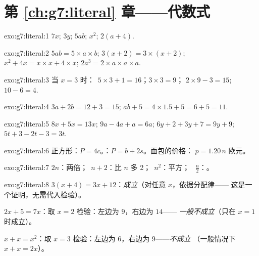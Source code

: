 \section*{第 \ref{ch:g7:literal} 章——代数式}

\begin{solution}{exo:g7:literal:1}
$7x$; \quad $3y$; \quad $5ab$; \quad $x^2$; \quad $2(a + 4)$.
\end{solution}

\begin{solution}{exo:g7:literal:2}
$5ab = 5 \times a \times b$; \quad
$3(x+2) = 3 \times (x + 2)$; \quad
$x^2 + 4x = x \times x + 4 \times x$; \quad
$2a^3 = 2 \times a \times a \times a$.
\end{solution}

\begin{solution}{exo:g7:literal:3}
当 $x = 3$ 时：\ $5 \times 3 + 1 = 16$；\quad $3 \times 3 = 9$；\quad
$2 \times 9 - 3 = 15$; \quad $10 - 6 = 4$.
\end{solution}

\begin{solution}{exo:g7:literal:4}
$3a + 2b = 12 + 3 = 15$; \qquad
$ab + 5 = 4 \times 1.5 + 5 = 6 + 5 = 11$.
\end{solution}

\begin{solution}{exo:g7:literal:5}
$8x + 5x = 13x$; \quad
$9a - 4a + a = 6a$; \quad
$6y + 2 + 3y + 7 = 9y + 9$; \quad
$5t + 3 - 2t - 3 = 3t$.
\end{solution}

\begin{solution}{exo:g7:literal:6}
正方形：$P = 4c$。：$P = b + 2s$。面包的价格：
$p = 1.20\,n$ 欧元。
\end{solution}

\begin{solution}{exo:g7:literal:7}
$2n$：两倍；\ $n + 2$：比 $n$ 多 2；\ $n^2$：平方；
\ $\frac n2$：。
\end{solution}

\begin{solution}{exo:g7:literal:8}
$3(x+4) = 3x + 12$：\emph{成立}（对任意 $x$，依据分配律——
这是一个证明，无需代入检验）。

$2x + 5 = 7x$：取 $x = 2$ 检验：左边为 $9$，右边为 $14$——
\emph{一般不成立}（只在 $x = 1$ 时成立）。

$x + x = x^2$：取 $x = 3$ 检验：左边为 $6$，右边为 $9$——\emph{不成立}
（一般情况下 $x + x = 2x$）。
\end{solution}

